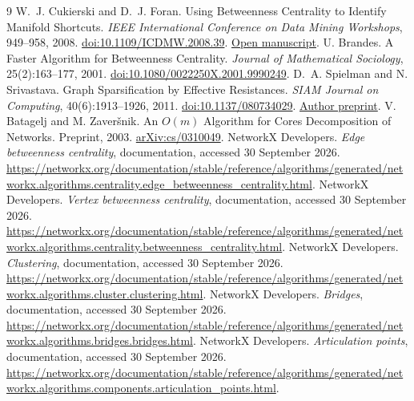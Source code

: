 \documentclass[11pt]{article}
\begin{document}
\clearpage
\begin{thebibliography}{9}
 W.~J. Cukierski and D.~J. Foran. Using Betweenness Centrality to Identify Manifold Shortcuts. \emph{IEEE International Conference on Data Mining Workshops}, 949--958, 2008. \href{https://doi.org/10.1109/ICDMW.2008.39}{doi:10.1109/ICDMW.2008.39}. \href{https://pmc.ncbi.nlm.nih.gov/articles/PMC2895570/}{Open manuscript}.
 U. Brandes. A Faster Algorithm for Betweenness Centrality. \emph{Journal of Mathematical Sociology}, 25(2):163--177, 2001. \href{https://doi.org/10.1080/0022250X.2001.9990249}{doi:10.1080/0022250X.2001.9990249}.
 D.~A. Spielman and N. Srivastava. Graph Sparsification by Effective Resistances. \emph{SIAM Journal on Computing}, 40(6):1913--1926, 2011. \href{https://doi.org/10.1137/080734029}{doi:10.1137/080734029}. \href{https://arxiv.org/abs/0803.0929}{Author preprint}.
 V. Batagelj and M. Zaver\v{s}nik. An $O(m)$ Algorithm for Cores Decomposition of Networks. Preprint, 2003. \href{https://arxiv.org/abs/cs/0310049}{arXiv:cs/0310049}.
 NetworkX Developers. \emph{Edge betweenness centrality}, documentation, accessed 30 September 2026. \url{https://networkx.org/documentation/stable/reference/algorithms/generated/networkx.algorithms.centrality.edge_betweenness_centrality.html}.
 NetworkX Developers. \emph{Vertex betweenness centrality}, documentation, accessed 30 September 2026. \url{https://networkx.org/documentation/stable/reference/algorithms/generated/networkx.algorithms.centrality.betweenness_centrality.html}.
 NetworkX Developers. \emph{Clustering}, documentation, accessed 30 September 2026. \url{https://networkx.org/documentation/stable/reference/algorithms/generated/networkx.algorithms.cluster.clustering.html}.
 NetworkX Developers. \emph{Bridges}, documentation, accessed 30 September 2026. \url{https://networkx.org/documentation/stable/reference/algorithms/generated/networkx.algorithms.bridges.bridges.html}.
 NetworkX Developers. \emph{Articulation points}, documentation, accessed 30 September 2026. \url{https://networkx.org/documentation/stable/reference/algorithms/generated/networkx.algorithms.components.articulation_points.html}.
\end{thebibliography}
\end{document}
